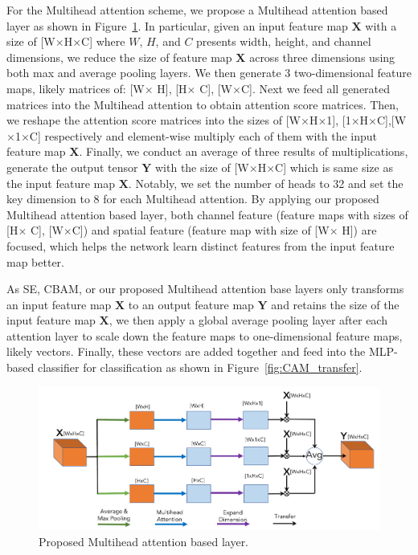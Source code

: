 \documentclass[sigconf]{acmart}
\begin{document}
For the Multihead attention scheme, we propose a Multihead attention based layer as shown in Figure~\ref{fig:CAM_pro_att}.
In particular, given an input feature map $\mathbf{X}$ with a size of [W$\times$H$\times$C] where $W$, $H$, and $C$ presents width, height, and channel dimensions, we reduce the size of feature map $\mathbf{X}$ across three dimensions using both max and average pooling layers.
We then generate 3 two-dimensional feature maps, likely matrices of: [W$\times$ H], [H$\times$ C], [W$\times$C]. 
Next we feed all generated matrices into the Multihead attention to obtain attention score matrices. 
Then, we reshape the attention score matrices into the sizes of [W$\times$H$\times$1], [1$\times$H$\times$C],[W$\times$1$\times$C] respectively and element-wise multiply each of them with the input feature map $\mathbf{X}$. 
Finally, we conduct an average of three results of multiplications, generate the output tensor $\mathbf{Y}$ with the size of [W$\times$H$\times$C] which is same size as the input feature map $\mathbf{X}$.
Notably, we set the number of heads to 32 and set the key dimension to 8 for each Multihead attention.
By applying our proposed Multihead attention based layer, both channel feature (feature maps with sizes of [H$\times$ C], [W$\times$C]) and spatial feature (feature map with size of [W$\times$ H]) are focused, which helps the network learn distinct features from the input feature map better.

As SE, CBAM, or our proposed Multihead attention base layers only transforms an input feature map $\mathbf{X}$ to an output feature map $\mathbf{Y}$ and retains the size of the input feature map $\mathbf{X}$, we then apply a global average pooling layer after each attention layer to scale down the feature maps to one-dimensional feature maps, likely vectors.
Finally, these vectors are added together and feed into the MLP-based classifier for classification as shown in Figure~\ref{fig:CAM_transfer}.
  
\begin{figure}[t]
    \centering
    \includegraphics[width=1.0\linewidth]{CAM_pro_att.pdf}
	\caption{Proposed Multihead attention based layer.}
    \label{fig:CAM_pro_att}
\end{figure}
\end{document}
